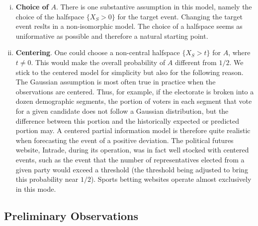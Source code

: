 \documentclass[11pt]{article}
\theoremstyle{definition}
\theoremstyle{definition}
\begin{document}
\begin{enumerate}[(i)]
\item {\bf Choice of} $A$.  There is one substantive assumption 
in this model, namely the choice of the halfspace $\{ X_S > 0 \}$ 
for the target event.  Changing the target event reslts in a 
non-isomorphic model.  The choice of a halfspace seems as 
uniformative as possible and therefore a natural starting point.
\item {\bf Centering}. One could choose a non-central halfspace 
$\{ X_S > t \}$ for $A$, where $t \neq 0$.  This would make the 
overall probability of $A$ different from $1/2$.  We stick to the 
centered model for simplicity but also for the following reason.  
The Gaussian assumption is most often true in practice when the 
observations are centered.  Thus, for example, if the electorate 
is broken into a dozen demographic segments, the portion of voters 
in each segment that vote for a given candidate does not follow a 
Gaussian distribution, but the difference between this portion and 
the historically expected or predicted portion may.  A centered 
partial information model is therefore quite realistic when forecasting 
the event of a positive deviation.  The political futures website, Intrade, 
during its operation, was in fact well stocked with centered events, 
such as the event that the number of representatives elected from 
a given party would exceed a threshold (the threshold being adjusted 
to bring this probability near $1/2$).  Sports betting websites operate 
almost exclusively in this mode.
\label{item:centered}
\end{enumerate}

\subsection{Preliminary Observations}
\end{document}
